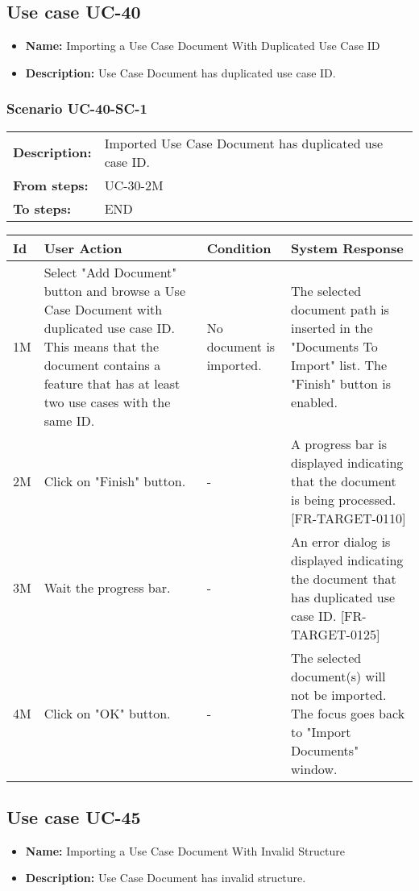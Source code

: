 \documentclass[a4paper,11pt]{article}
\newcommand{\bl}{\\ \hline}
\begin{document}
\subsection*{Use case UC-40}
\begin{itemize}
\item {\bf Name: }Importing a Use Case Document With Duplicated Use Case ID
\item {\bf Description: }Use Case Document has duplicated use case ID.
\end{itemize}
\subsubsection*{Scenario UC-40-SC-1}
\begin{tabular}{p{1in}p{4in}}
{\bf Description:} & Imported Use Case Document has duplicated use case ID. \\
{\bf From steps:} & UC-30-2M \\
{\bf To steps:} & END \\
\end{tabular}
 
\begin{tabular}{|p{0.8in}|p{1.6in}|p{1.6in}|p{1.6in}|}
\hline
Id & User Action & Condition & System Response  \bl 
1M & Select "Add Document" button and browse a Use Case Document with duplicated use case ID. This means that the document contains a feature that has at least two use cases with the same ID. & No document is imported. & The selected document path is inserted in the "Documents To Import" list. The "Finish" button is enabled. \bl 
2M & Click on "Finish" button. & - & A progress bar is displayed indicating that the document is being processed. [FR-TARGET-0110] \bl 
3M & Wait the progress bar. & - & An error dialog is displayed indicating the document that has duplicated use case ID. [FR-TARGET-0125] \bl 
4M & Click on "OK" button. & - & The selected document(s) will not be imported. The focus goes back to "Import Documents" window. \bl 
\end{tabular}
\subsection*{Use case UC-45}
\begin{itemize}
\item {\bf Name: }Importing a Use Case Document With Invalid Structure
\item {\bf Description: }Use Case Document has invalid structure.
\end{itemize}
\end{document}
